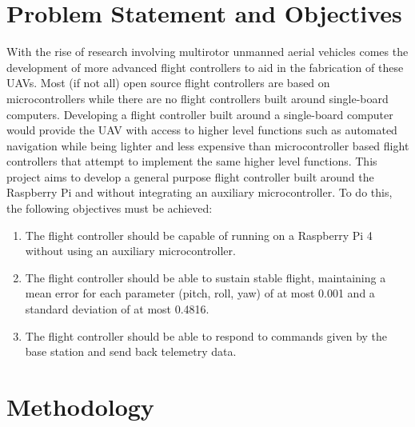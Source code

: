 \documentclass[english]{upeeei}
\begin{document}
\chapter{Problem Statement and Objectives}
With the rise of research involving multirotor unmanned aerial vehicles comes the development of more advanced flight controllers to aid in the
fabrication of these UAVs. Most (if not all) open source flight controllers are based on microcontrollers while there are no flight controllers
built around single-board computers. Developing a flight controller built around a single-board computer would provide the UAV with access to 
higher level functions such as automated navigation while being lighter and less expensive than microcontroller based flight controllers that
attempt to implement the same higher level functions.
\newline
\newline
This project aims to develop a general purpose flight controller built around the Raspberry Pi and without integrating an auxiliary microcontroller.
To do this, the following objectives must be achieved: 
\begin{enumerate}
    \item The flight controller should be capable of running on a Raspberry Pi 4 without using an auxiliary microcontroller.
    \item The flight controller should be able to sustain stable flight, maintaining a mean error for each parameter (pitch, roll, yaw) of at most 0.001\textdegree
        and a standard deviation of at most 0.4816\textdegree.
    \item The flight controller should be able to respond to commands given by the base station and send back telemetry data.
\end{enumerate}

\chapter{Methodology}
\end{document}
